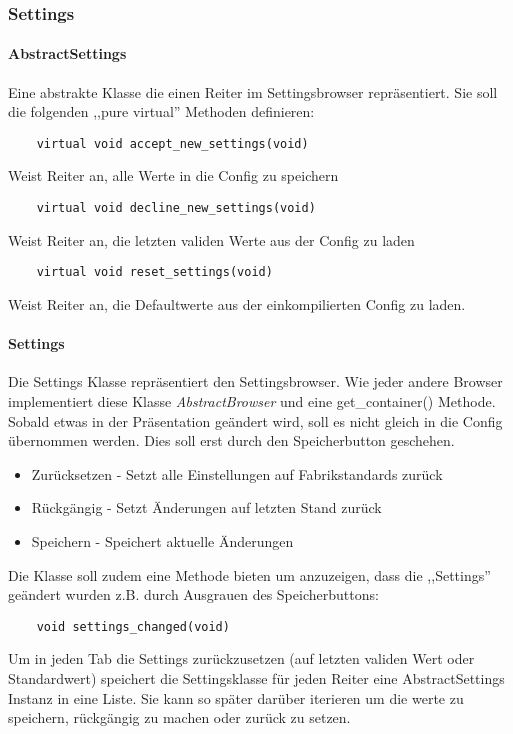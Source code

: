 \subsubsection{Settings}
\paragraph{AbstractSettings}
Eine abstrakte Klasse die einen Reiter im Settingsbrowser repräsentiert. 
Sie soll die folgenden ,,pure virtual'' Methoden definieren:

\begin{verbatim}
    virtual void accept_new_settings(void)
\end{verbatim}
Weist Reiter an, alle Werte in die Config zu speichern
     
\begin{verbatim}
    virtual void decline_new_settings(void)
\end{verbatim}     
Weist Reiter an, die letzten validen Werte aus der Config zu laden

\begin{verbatim}
    virtual void reset_settings(void)
\end{verbatim}
Weist Reiter an, die Defaultwerte aus der einkompilierten Config zu laden.

\paragraph{Settings}
Die Settings Klasse repräsentiert den Settingsbrowser. Wie jeder andere Browser implementiert diese Klasse \emph{AbstractBrowser} und eine get\_container() Methode.
Sobald etwas in der Präsentation geändert wird, soll es nicht gleich in die Config übernommen werden.
Dies soll erst durch den Speicherbutton geschehen.
\begin{itemize}
\item Zurücksetzen - Setzt alle Einstellungen auf Fabrikstandards zurück
\item Rückgängig - Setzt Änderungen auf letzten Stand zurück
\item Speichern - Speichert aktuelle Änderungen
\end{itemize}

Die Klasse soll zudem eine Methode bieten um anzuzeigen, dass die ,,Settings'' geändert wurden z.B. durch Ausgrauen des Speicherbuttons:
\begin{verbatim}
    void settings_changed(void)
\end{verbatim}
Um in jeden Tab die Settings zurückzusetzen (auf letzten validen Wert oder Standardwert) speichert die Settingsklasse für jeden Reiter eine AbstractSettings Instanz in eine Liste. Sie kann so später darüber iterieren um die werte zu speichern, rückgängig zu machen oder zurück zu setzen. 

